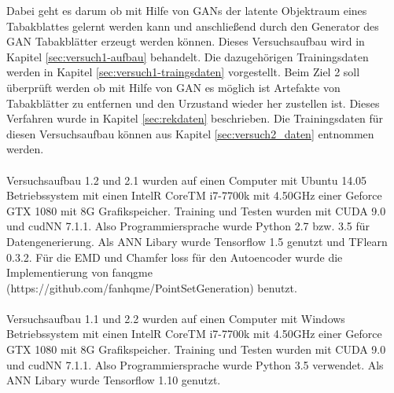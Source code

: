 \documentclass{llncs}
\begin{document}
Dabei geht es darum ob mit Hilfe von GANs der latente Objektraum eines Tabakblattes gelernt werden kann und anschließend durch den Generator des GAN Tabakblätter erzeugt werden können. Dieses Versuchsaufbau wird in Kapitel \ref{sec:versuch1-aufbau} behandelt. Die dazugehörigen Trainingsdaten werden in Kapitel \ref{sec:versuch1-traingsdaten} vorgestellt. Beim Ziel 2 soll überprüft werden ob mit Hilfe von GAN es möglich ist Artefakte von Tabakblätter zu entfernen und den Urzustand wieder her zustellen ist.  Dieses Verfahren wurde in Kapitel \ref{sec:rekdaten} beschrieben. Die Trainingsdaten für diesen Versuchsaufbau können aus Kapitel \ref{sec:versuch2_daten} entnommen werden. 
\\\\
Versuchsaufbau 1.2 und 2.1 wurden auf einen Computer mit Ubuntu 14.05 Betriebssystem mit einen IntelR CoreTM i7-7700k mit 4.50GHz einer Geforce GTX 1080 mit 8G Grafikspeicher. Training und Testen wurden mit CUDA 9.0 und cudNN 7.1.1. Also Programmiersprache wurde Python 2.7 bzw. 3.5 für Datengenerierung. Als ANN Libary wurde Tensorflow 1.5 genutzt und TFlearn 0.3.2. Für die EMD und Chamfer loss für den Autoencoder wurde die Implementierung von  fanqgme (https://github.com/fanhqme/PointSetGeneration) benutzt.
\\\\
Versuchsaufbau 1.1 und 2.2  wurden auf einen Computer mit Windows Betriebssystem mit einen IntelR CoreTM i7-7700k mit 4.50GHz einer Geforce GTX 1080 mit 8G Grafikspeicher. Training und Testen wurden mit CUDA 9.0 und cudNN 7.1.1. Also Programmiersprache wurde Python 3.5 verwendet. Als ANN Libary wurde Tensorflow 1.10 genutzt.
\end{document}
